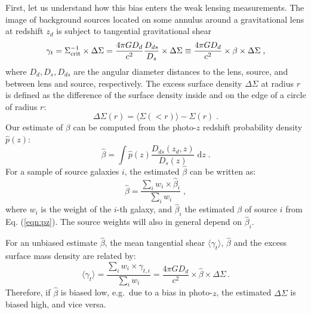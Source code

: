 {First, let us understand how this bias enters the weak lensing measurements. The image of background sources located on some annulus around a gravitational lens at redshift $z_d$ is subject to tangential gravitational shear \citep[e.g.][for a review]{2001PhR...340..291B}
\begin{equation}
\gamma_t=\Sigma_{\rm crit}^{-1}\times\Delta\Sigma=\frac{4\pi G D_{d}}{c^2}\frac{D_{ds}}{D_s}\times\Delta\Sigma\equiv \frac{4\pi G D_{d}}{c^2}\times\beta\times\Delta\Sigma \; ,
\end{equation}
where $D_d, D_s, D_{ds}$ are the angular diameter distances to the lens, source, and between lens and source, respectively. The excess surface density $\Delta\Sigma$ at radius $r$ is defined as the difference of the surface density inside and on the edge of a circle of radius $r$:
\begin{equation}
\Delta\Sigma(r)=\langle\Sigma(<r)\rangle-\Sigma(r) \; .
\end{equation}
Our estimate of $\beta$ can be computed from the photo-$z$ redshift probability density $\hat{p}(z)$:
\begin{equation}
\hat{\beta}=\int\hat{p}(z) \frac{D_{ds}(z_d,z)}{D_s(z)}\; \mathrm{d}z \; .
\label{eqn:pz}
\end{equation}
For a sample of source galaxies $i$, the estimated $\hat{\beta}$ can be written as:
\begin{equation}
\hat{\beta}=\frac{\sum_i w_i\times\hat{\beta}_i}{\sum_i w_i} \; ,
\label{eqn:nz}
\end{equation}
where $w_i$ is the weight of the $i$-th galaxy, and $\hat{\beta}_i$ the estimated $\beta$ of source $i$ from Eq. (\ref{eqn:pz}). The source weights will also in general depend on $\hat{\beta}_i$. %

For an unbiased estimate $\hat{\beta}$, the mean tangential shear $\langle\gamma_t\rangle$, $\hat{\beta}$ and the excess surface mass density are related by:
\begin{equation}
\langle\gamma_t\rangle=\frac{\sum_i w_i\times\gamma_{t,i}}{\sum_i w_i}=\frac{4\pi G D_{d}}{c^2}\times\hat{\beta}\times\Delta\Sigma \, .
\end{equation}
Therefore, if $\hat{\beta}$ is biased low, e.g.~due to a bias in photo-$z$, the estimated $\Delta\Sigma$ is biased high, and vice versa.

}
